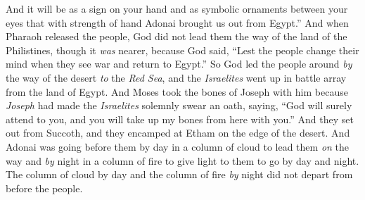 \begin{biblechapter}
\verse And it will be as a sign on your hand and as symbolic ornaments between your eyes that with strength of hand Adonai brought us out from Egypt.”
 And when Pharaoh released the people, God did not lead them the way of the land of the Philistines, though it \textit{was} nearer, because God said, “Lest the people change their mind when they see war and return to Egypt.”
\verse So God led the people around \textit{by} the way of the desert \textit{to} the \textit{Red Sea}, and the \textit{Israelites} went up in battle array from the land of Egypt.
\verse And Moses took the bones of Joseph with him because \textit{Joseph} had made the \textit{Israelites} solemnly swear an oath, saying, “God will surely attend to you, and you will take up my bones from here with you.”
\verse And they set out from Succoth, and they encamped at Etham on the edge of the desert.
\verse And Adonai was going before them by day in a column of cloud to lead them \textit{on} the way and \textit{by} night in a column of fire to give light to them to go by day and night.
\verse The column of cloud by day and the column of fire \textit{by} night did not depart from before the people.
\end{biblechapter}


